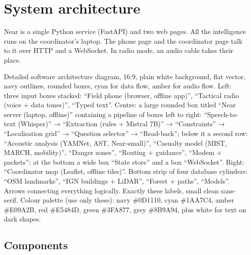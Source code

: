 \chapter{System architecture}\label{ch:arch}

Near is a single Python service (FastAPI) and two web pages. All the intelligence runs on the
coordinator's laptop. The phone page and the coordinator page talk to it over HTTP and a
WebSocket. In radio mode, an audio cable takes their place.

{Detailed software architecture diagram, 16:9, plain white background, flat vector, navy outlines, rounded boxes, cyan
for data flow, amber for audio flow. Left: three input boxes stacked: ``Field phone (browser, offline app)'',
``Tactical radio (voice + data tones)'', ``Typed text''. Centre: a large rounded box titled ``Near server (laptop,
offline)'' containing a pipeline of boxes left to right: ``Speech-to-text (Whisper)'' → ``Extraction (rules +
Mistral 7B)'' → ``Constraints'' → ``Localisation grid'' → ``Question selector'' → ``Read-back''; below it a second
row: ``Acoustic analysis (YAMNet, AST, Near-small)'', ``Casualty model (MIST, MARCH, mobility)'', ``Danger zones'',
``Routing + guidance'', ``Modem + packets''; at the bottom a wide box ``State store'' and a box ``WebSocket''.
Right: ``Coordinator map (Leaflet, offline tiles)''. Bottom strip of four database cylinders: ``OSM landmarks'',
``IGN buildings + LiDAR'', ``Forest + paths'', ``Models''. Arrows connecting everything logically. Exactly these
labels, small clean sans-serif. Colour palette (use only these): navy \#0D1110, cyan \#1AA7C4, amber \#E09A2B, red \#E5484D, green \#3FA877, grey \#8B9A94, plus white for text on dark shapes.}

\section{Components}

